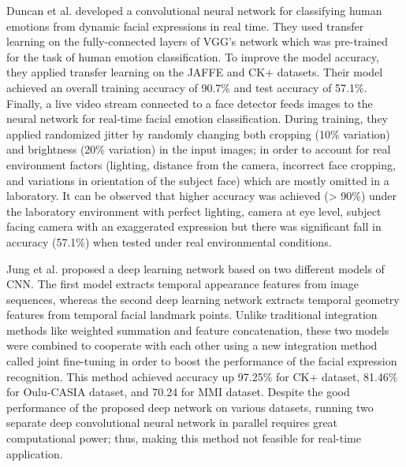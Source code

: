 \documentclass[master]{thesis-uestc}
\begin{document}
Duncan et al.\cite{duncan2016} developed a convolutional neural network for classifying human emotions from dynamic facial expressions in real time. They used transfer learning on the fully-connected layers of VGG's network which was pre-trained for the task of human emotion classification. To improve the model accuracy, they applied transfer learning on the JAFFE and CK+ datasets. Their model achieved an overall training accuracy of 90.7\% and test accuracy of 57.1\%. Finally, a live video stream connected to a face detector feeds images to the neural network for real-time facial emotion classification. During training, they applied randomized jitter by randomly changing both cropping (10\% variation) and brightness (20\% variation) in the input images; in order to account for real environment factors (lighting, distance from the camera, incorrect face cropping, and variations in orientation of the subject face) which are mostly omitted in a laboratory. It can be observed that higher accuracy was achieved (> 90\%) under the laboratory environment with perfect lighting, camera at eye level, subject facing camera with an exaggerated expression but there was significant fall in accuracy (57.1\%) when tested under real environmental conditions.

Jung et al.\cite{7410698} proposed a deep learning network based on two different models of CNN. The first model extracts temporal appearance features from image sequences, whereas the second deep learning network extracts temporal geometry features from temporal facial landmark points. Unlike traditional integration methods like weighted summation and feature concatenation, these two models were combined to cooperate with each other using a new integration method called joint fine-tuning in order to boost the performance of the facial expression recognition. This method achieved accuracy up 97.25\% for CK+ dataset, 81.46\% for Oulu-CASIA dataset\cite{ZHAO2011607}, and 70.24 for MMI dataset\cite{1521424}\cite{Valstar10induceddisgust}. Despite the good performance of the proposed deep network on various datasets, running two separate deep convolutional neural network in parallel requires great computational power; thus, making this method not feasible for real-time application.
\end{document}
